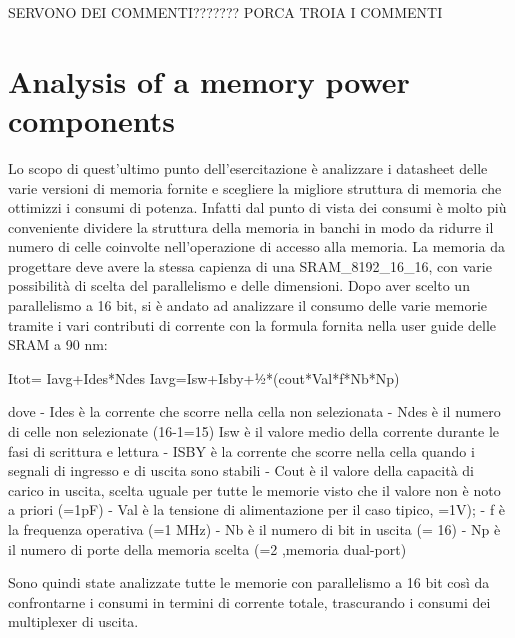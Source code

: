 SERVONO DEI COMMENTI??????? PORCA TROIA I COMMENTI

\section{Analysis of a memory power components}
Lo scopo di quest’ultimo punto dell’esercitazione è  analizzare i datasheet delle varie versioni di memoria fornite e scegliere la migliore struttura di memoria che ottimizzi i consumi di potenza. Infatti dal punto di vista dei consumi è molto più conveniente dividere la struttura della memoria in banchi in modo da ridurre il numero di celle coinvolte nell’operazione di accesso alla memoria. 
La memoria da progettare deve avere la stessa capienza di una SRAM_8192_16_16, con varie possibilità di scelta del parallelismo e delle dimensioni.
Dopo aver scelto un parallelismo a 16 bit, si è andato ad analizzare il consumo delle varie memorie tramite i vari contributi di corrente con la formula fornita nella user guide delle SRAM a 90 nm:

Itot= Iavg+Ides*Ndes
Iavg=Isw+Isby+½*(cout*Val*f*Nb*Np)

dove
- Ides è la corrente che scorre nella cella non selezionata
- Ndes è il numero di celle non selezionate (16-1=15)
Isw è il valore medio della corrente durante le fasi di scrittura e lettura
- ISBY è la corrente che scorre nella cella quando i segnali di ingresso e di uscita sono stabili
- Cout è il valore della capacità di carico in uscita, scelta uguale per tutte le memorie visto che il valore non è noto a priori (=1pF)
- Val è la tensione di alimentazione per il caso tipico, =1V);
- f è la frequenza operativa (=1 MHz)
- Nb è il numero di bit in uscita (= 16)
- Np è il numero di porte della memoria scelta (=2 ,memoria dual-port)

Sono quindi state analizzate tutte le memorie con parallelismo a 16 bit così da confrontarne i consumi in termini di corrente totale, trascurando i consumi dei multiplexer di uscita.


